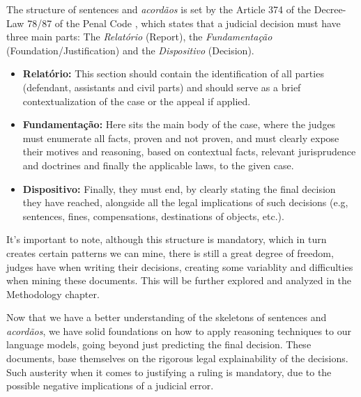 \documentclass[11pt,a4paper,twoside,openright]{book}
\begin{document}
\par The structure of sentences and \textit{acordãos} is set by the Article 374 of the Decree-Law 78/87 of the Penal Code \parencite{noauthor_lei_78/87}, which states that 
a judicial decision must have three main parts: The \textit{Relatório} (Report), the \textit{Fundamentação} (Foundation/Justification) and the \textit{Dispositivo} (Decision).

\begin{itemize}
    \item \textbf{Relatório:} This section should contain the identification of all parties (defendant, assistants and civil parts) and should serve as a brief contextualization of the case or the appeal if applied.
    \item \textbf{Fundamentação:} Here sits the main body of the case, where the judges must enumerate all facts, proven and not proven, and must clearly expose their motives and reasoning, based on contextual facts, relevant jurisprudence and doctrines and finally the applicable laws, to the given case.
    \item \textbf{Dispositivo:} Finally, they must end, by clearly stating the final decision they have reached, alongside all the legal implications of such decisions (e.g, sentences, fines, compensations, destinations of objects, etc.).
    
\end{itemize}

It's important to note, although this structure is mandatory, which in turn creates certain patterns we can mine, there is still a great degree of freedom, judges have when writing their decisions, creating some variablity and difficulties when mining these documents.
This will be further explored and analyzed in the Methodology chapter.

\par Now that we have a better understanding of the skeletons of sentences and \textit{acordãos}, we have solid foundations on how to apply reasoning techniques to our language models, going beyond just predicting the final decision.
These documents, base themselves on the rigorous legal explainability of the decisions. Such austerity when it comes to justifying a ruling is mandatory, due to the possible negative implications of a judicial error.


\end{document}
